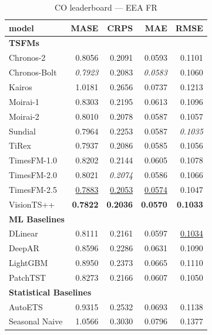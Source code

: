 \begin{table}[H]
\caption{CO leaderboard --- EEA FR}
\centering
\begin{small}
\begin{tabular}{lrrrr}
\toprule
model & MASE & CRPS & MAE & RMSE \\
\midrule
\multicolumn{5}{l}{\textbf{TSFMs}} \\
Chronos-2 & 0.8056 & 0.2091 & 0.0593 & 0.1101 \\
Chronos-Bolt & \textit{0.7923} & 0.2083 & \textit{0.0583} & 0.1060 \\
Kairos & 1.0181 & 0.2656 & 0.0737 & 0.1213 \\
Moirai-1 & 0.8303 & 0.2195 & 0.0613 & 0.1096 \\
Moirai-2 & 0.8010 & 0.2078 & 0.0587 & 0.1057 \\
Sundial & 0.7964 & 0.2253 & 0.0587 & \textit{0.1035} \\
TiRex & 0.7937 & 0.2086 & 0.0585 & 0.1056 \\
TimesFM-1.0 & 0.8202 & 0.2144 & 0.0605 & 0.1078 \\
TimesFM-2.0 & 0.8021 & \textit{0.2074} & 0.0586 & 0.1066 \\
TimesFM-2.5 & \underline{0.7883} & \underline{0.2053} & \underline{0.0574} & 0.1047 \\
VisionTS++ & \textbf{0.7822} & \textbf{0.2036} & \textbf{0.0570} & \textbf{0.1033} \\
\midrule
\multicolumn{5}{l}{\textbf{ML Baselines}} \\
DLinear & 0.8111 & 0.2161 & 0.0597 & \underline{0.1034} \\
DeepAR & 0.8596 & 0.2286 & 0.0631 & 0.1090 \\
LightGBM & 0.8950 & 0.2373 & 0.0665 & 0.1110 \\
PatchTST & 0.8273 & 0.2166 & 0.0607 & 0.1050 \\
\midrule
\multicolumn{5}{l}{\textbf{Statistical Baselines}} \\
AutoETS & 0.9315 & 0.2532 & 0.0693 & 0.1138 \\
Seasonal Naive & 1.0566 & 0.3030 & 0.0796 & 0.1377 \\
\bottomrule
\end{tabular}
\end{small}
\end{table}